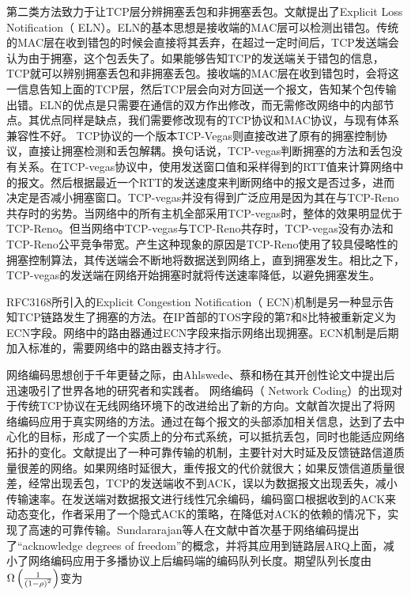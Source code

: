 \par
第二类方法致力于让TCP层分辨拥塞丢包和非拥塞丢包。文献\cite{buchholcz2003explicit}提出了Explicit Loss Notification（ ELN）。ELN的基本思想是接收端的MAC层可以检测出错包。传统的MAC层在收到错包的时候会直接将其丢弃，在超过一定时间后，TCP发送端会认为由于拥塞，这个包丢失了。如果能够告知TCP的发送端关于错包的信息，TCP就可以辨别拥塞丢包和非拥塞丢包。接收端的MAC层在收到错包时，会将这一信息告知上面的TCP层，然后TCP层会向对方回送一个报文，告知某个包传输出错。ELN的优点是只需要在通信的双方作出修改，而无需修改网络中的内部节点。其优点同样是缺点，我们需要修改现有的TCP协议和MAC协议，与现有体系兼容性不好。
TCP协议的一个版本TCP-Vegas\textsuperscript{\cite{brakmo1995tcp}}则直接改进了原有的拥塞控制协议，直接让拥塞检测和丢包解耦。换句话说，TCP-vegas判断拥塞的方法和丢包没有关系。在TCP-vegas协议中，使用发送窗口值和采样得到的RTT值来计算网络中的报文。然后根据最近一个RTT的发送速度来判断网络中的报文是否过多，进而决定是否减小拥塞窗口。TCP-vegas并没有得到广泛应用是因为其在与TCP-Reno共存时的劣势。当网络中的所有主机全部采用TCP-vegas时，整体的效果明显优于TCP-Reno。但当网络中TCP-vegas与TCP-Reno共存时，TCP-vegas没有办法和TCP-Reno公平竞争带宽。产生这种现象的原因是TCP-Reno使用了较具侵略性的拥塞控制算法，其传送端会不断地将数据送到网络上，直到拥塞发生。相比之下，TCP-vegas的发送端在网络开始拥塞时就将传送速率降低，以避免拥塞发生。
\par
RFC3168所引入的Explicit Congestion Notification（ ECN)机制\textsuperscript{\cite{ramakrishnan2001rfc}}是另一种显示告知TCP链路发生了拥塞的方法。在IP首部的TOS字段的第7和8比特被重新定义为ECN字段。网络中的路由器通过ECN字段来指示网络出现拥塞。ECN机制是后期加入标准的，需要网络中的路由器支持才行。
\par
网络编码思想创于千年更替之际，由Ahlswede、蔡和杨在其开创性论文\cite{Ahlswede2000}中提出后迅速吸引了世界各地的研究者和实践者。
网络编码（ Network Coding）的出现对于传统TCP协议在无线网络环境下的改进给出了新的方向。文献\cite{chou2003practical}首次提出了将网络编码应用于真实网络的方法。通过在每个报文的头部添加相关信息，达到了去中心化的目标，形成了一个实质上的分布式系统，可以抵抗丢包，同时也能适应网络拓扑的变化。文献\cite{ontheflycoding}提出了一种可靠传输的机制，主要针对大时延及反馈链路信道质量很差的网络。如果网络时延很大，重传报文的代价就很大；如果反馈信道质量很差，经常出现丢包，TCP的发送端收不到ACK，误以为数据报文出现丢失，减小传输速率。在发送端对数据报文进行线性冗余编码，编码窗口根据收到的ACK来动态变化，作者采用了一个隐式ACK的策略，在降低对ACK的依赖的情况下，实现了高速的可靠传输。Sundararajan等人在文献\cite{4595268}中首次基于网络编码提出了“acknowledge degrees of freedom”的概念，并将其应用到链路层ARQ上面，减小了网络编码应用于多播协议上后编码端的编码队列长度。期望队列长度由$\Omega \left( {\frac{1}{{{{\left( {1{\rm{ - }}\rho } \right)}^2}}}} \right)$变为
